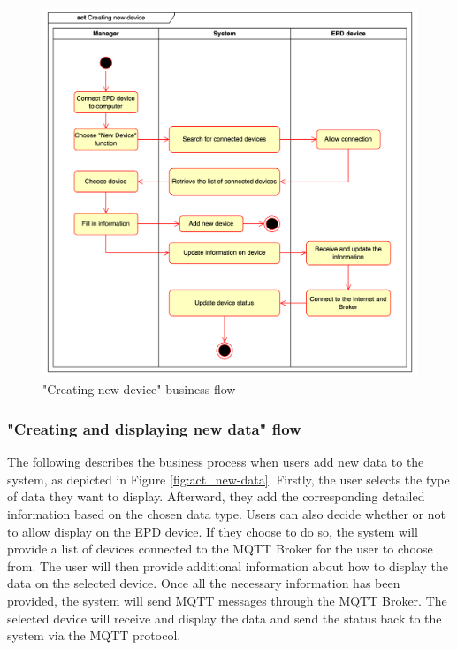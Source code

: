 \documentclass[../Main.tex]{subfiles}
\begin{document}
\begin{figure}[H]
    \centering
    \includegraphics[scale=0.155]{doc/imgs/act_new-device.png}
    \caption{"Creating new device" business flow}
    \label{fig:act_new-device}
\end{figure}

\subsubsection{"Creating and displaying new data" flow}
The following describes the business process when users add new data to the system, as depicted in Figure \ref{fig:act_new-data}. Firstly, the user selects the type of data they want to display. Afterward, they add the corresponding detailed information based on the chosen data type. Users can also decide whether or not to allow display on the \gls{EPD} device. If they choose to do so, the system will provide a list of devices connected to the MQTT Broker for the user to choose from. The user will then provide additional information about how to display the data on the selected device. Once all the necessary information has been provided, the system will send MQTT messages through the MQTT Broker. The selected device will receive and display the data and send the status back to the system via the MQTT protocol.
\end{document}
